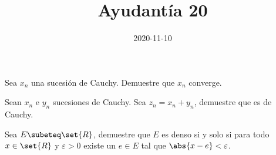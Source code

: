 \documentclass{ayudantia}
\title{Ayudantía 20}
\date{2020-11-10}
\begin{document}
\maketitle

\begin{prob}
    Sea \(x_n\) una sucesión de Cauchy. Demuestre que \(x_n\) converge.
\end{prob}

\begin{ans}
    \begin{sol}

    \end{sol}
\end{ans}



\begin{prob}
    Sean \(x_n\) e \(y_n\) sucesiones de Cauchy. Sea \(z_n=x_n+y_n\), demuestre que es de Cauchy.
\end{prob}

\begin{ans}
    \begin{sol}

    \end{sol}
\end{ans}



\begin{prob}

\end{prob}

\begin{ans}
    \begin{sol}

    \end{sol}
\end{ans}



\begin{prob}
    Sea \(E\subeteq\set{R}\), demuestre que \(E\) es denso si y solo si para todo \(x\in\set{R}\) y \(\varepsilon>0\) existe un \(e\in E\) tal que \(\abs{x-e}<\varepsilon\).
\end{prob}

\begin{ans}
    \begin{sol}

    \end{sol}
\end{ans}
\end{document}
